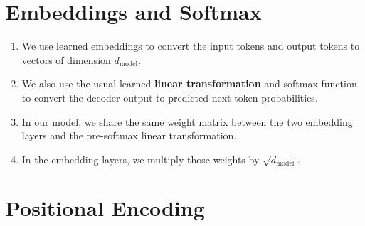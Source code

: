 \section{Embeddings and Softmax}

\begin{enumerate}
    \item We use learned embeddings to convert the input tokens and output tokens to vectors of dimension $d_{\text{model}}$. 
    \hfill \cite{arxiv/1706.03762/Attention-Is-All-You-Need}
    
    \item We also use the usual learned \textbf{linear transformation} and softmax function to convert the decoder output to predicted next-token probabilities. 
    \hfill \cite{arxiv/1706.03762/Attention-Is-All-You-Need}

    \item In our model, we share the same weight matrix between the two embedding layers and the pre-softmax linear transformation. 
    \hfill \cite{arxiv/1706.03762/Attention-Is-All-You-Need}
    
    \item In the embedding layers, we multiply those weights by $\sqrt{d_{\text{model}}}$.
    \hfill \cite{arxiv/1706.03762/Attention-Is-All-You-Need}
\end{enumerate}





\section{Positional Encoding}


